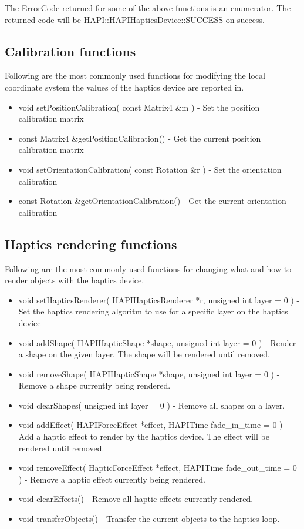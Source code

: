 The ErrorCode returned for some of the above functions is an enumerator. The
returned code will be HAPI::HAPIHapticsDevice::SUCCESS on success.

\subsection{Calibration functions}
Following are the most commonly used functions for modifying the local
coordinate system the values of the haptics device are reported in.

\begin{itemize}
\item {\ttfamily void setPositionCalibration( const Matrix4 \&m )} - Set the
 position calibration matrix
\item {\ttfamily const Matrix4 \&getPositionCalibration()} - Get the current
 position calibration matrix
\item {\ttfamily void setOrientationCalibration( const Rotation \&r )} - Set the
  orientation calibration
\item {\ttfamily const Rotation \&getOrientationCalibration()} - Get the
  current orientation calibration
\end{itemize}


\subsection{Haptics rendering functions}
\label{ssHapticsRenderingFunctions}
Following are the most commonly used functions for changing what and
how to render objects with the haptics device. 

\begin{itemize} 

\item {\ttfamily void setHapticsRenderer( HAPIHapticsRenderer *r, unsigned int
  layer = 0 )} - Set the haptics rendering algoritm to use for a
  specific layer on the haptics device

\item {\ttfamily void addShape( HAPIHapticShape *shape, unsigned int layer = 0 )
 } - Render a shape on the given layer. The shape will be rendered
  until removed.
\item {\ttfamily void removeShape( HAPIHapticShape *shape, unsigned int layer = 0
  )} - Remove a shape currently being rendered.
\item {\ttfamily void clearShapes( unsigned int layer = 0 )} - Remove all shapes
  on a layer. 

\item {\ttfamily void addEffect( HAPIForceEffect *effect, HAPITime fade\_in\_time = 0 )} - Add a haptic
  effect to render by the haptics device. The effect will be rendered
  until removed.
\item {\ttfamily void removeEffect( HapticForceEffect *effect, HAPITime fade\_out\_time = 0 )} - Remove a haptic
  effect currently being rendered.
\item {\ttfamily void clearEffects()} - Remove all haptic effects currently rendered.
\item {\ttfamily void transferObjects()} - Transfer the current objects to the haptics loop.
\end{itemize}

